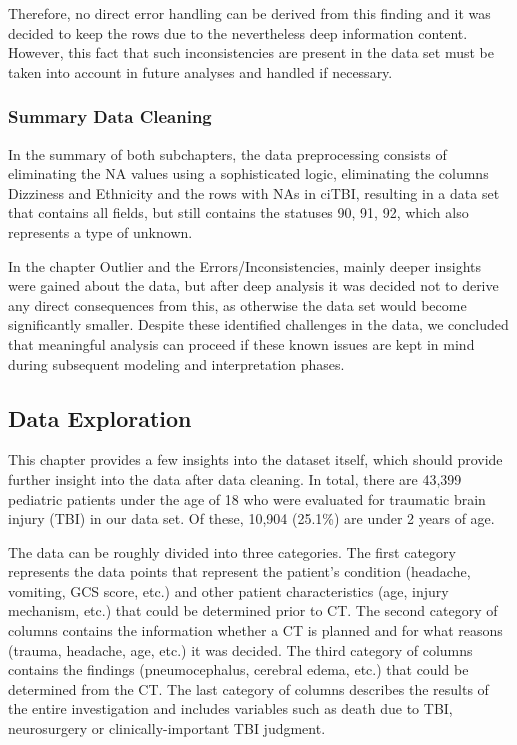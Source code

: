 \documentclass[10pt,letterpaper]{article}
\begin{document}
Therefore, no direct error handling can be derived from this finding and it was decided to keep the rows due to the nevertheless deep information content. However, this fact that such inconsistencies are present in the data set must be taken into account in future analyses and handled if necessary.

\subsubsection{Summary Data Cleaning}

In the summary of both subchapters, the data preprocessing consists of eliminating the NA values using a sophisticated logic, eliminating the columns Dizziness and Ethnicity and the rows with NAs in ciTBI, resulting in a data set that contains all fields, but still contains the statuses 90, 91, 92, which also represents a type of unknown.

In the chapter Outlier and the Errors/Inconsistencies, mainly deeper insights were gained about the data, but after deep analysis it was decided not to derive any direct consequences from this, as otherwise the data set would become significantly smaller. Despite these identified challenges in the data, we concluded that meaningful analysis can proceed if these known issues are kept in mind during subsequent modeling and interpretation phases.

\subsection{Data Exploration}\label{data-exploration}

This chapter provides a few insights into the dataset itself, which should provide further insight into the data after data cleaning. In total, there are 43,399 pediatric patients under the age of 18 who were evaluated for traumatic brain injury (TBI) in our data set. Of these, 10,904 (25.1\%) are under 2 years of age.

The data can be roughly divided into three categories. The first category represents the data points that represent the patient's condition (headache, vomiting, GCS score, etc.) and other patient characteristics (age, injury mechanism, etc.) that could be determined prior to CT. The second category of columns contains the information whether a CT is planned and for what reasons (trauma, headache, age, etc.) it was decided. The third category of columns contains the findings (pneumocephalus, cerebral edema, etc.) that could be determined from the CT. The last category of columns describes the results of the entire investigation and includes variables such as death due to TBI, neurosurgery or clinically-important TBI judgment.
\end{document}
